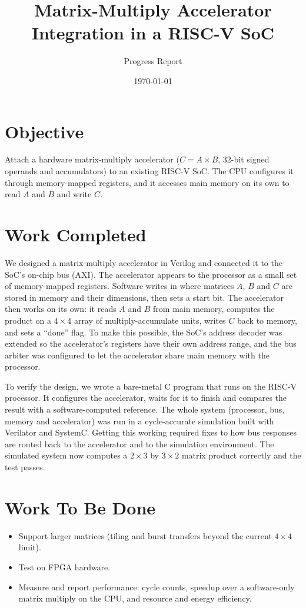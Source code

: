 \documentclass[10pt]{article}
\title{\vspace{-1.5em}Matrix-Multiply Accelerator Integration in a RISC-V SoC\vspace{-0.5em}}
\author{Progress Report}
\date{\vspace{-1em}\today}
\begin{document}
\maketitle
\vspace{-1em}

\section*{Objective}
Attach a hardware matrix-multiply accelerator ($C = A \times B$, 32-bit signed
operands and accumulators) to an existing RISC-V SoC. The CPU configures it
through memory-mapped registers, and it accesses main memory on its own to
read $A$ and $B$ and write $C$.

\section*{Work Completed}
We designed a matrix-multiply accelerator in Verilog and connected it to
the SoC's on-chip bus (AXI). The accelerator appears to the processor as a
small set of memory-mapped registers. Software writes in where matrices
$A$, $B$ and $C$ are stored in memory and their dimensions, then sets a
start bit. The accelerator then works on its own: it reads $A$ and $B$
from main memory, computes the product on a $4\times4$ array of
multiply-accumulate units, writes $C$ back to memory, and sets a
``done'' flag. To make this possible, the SoC's address decoder was
extended so the accelerator's registers have their own address range, and
the bus arbiter was configured to let the accelerator share main memory
with the processor.

To verify the design, we wrote a bare-metal C program that runs on the
RISC-V processor. It configures the accelerator, waits for it to finish
and compares the result with a software-computed reference. The whole
system (processor, bus, memory and accelerator) was run in a cycle-accurate
simulation built with Verilator and SystemC. Getting this working required
fixes to how bus responses are routed back to the accelerator and to the
simulation environment. The simulated system now computes a
$2\times3$ by $3\times2$ matrix product correctly and the test passes.

\section*{Work To Be Done}
\begin{itemize}
  \item Support larger matrices (tiling and burst transfers beyond the
  current $4\times4$ limit).
  \item Test on FPGA hardware.
  \item Measure and report performance: cycle counts, speedup over a
  software-only matrix multiply on the CPU, and resource and energy
  efficiency.
\end{itemize}
\end{document}
